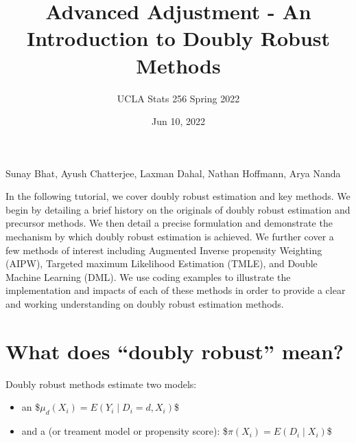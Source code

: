 \documentclass[letterpaper,10pt,english]{jupyterBook}
\title{Advanced Adjustment - An Introduction to Doubly Robust Methods}
\date{Jun 10, 2022}
\author{UCLA Stats 256 Spring 2022}
\begin{document}
\pagestyle{empty}
\sphinxmaketitle
\pagestyle{plain}
\sphinxtableofcontents
\pagestyle{normal}
\label{\detokenize{intro::doc}}


\begin{DUlineblock}{0em}
\item[] 
\end{DUlineblock}

\sphinxAtStartPar
{} Sunay Bhat, Ayush Chatterjee, Laxman Dahal, Nathan Hoffmann, Arya Nanda

\begin{DUlineblock}{0em}
\item[] 
\end{DUlineblock}

\sphinxAtStartPar
In the following tutorial, we cover doubly robust estimation and key methods. We begin by detailing a brief history on the originals of doubly robust estimation and precursor methods. We then detail a precise formulation and demonstrate the mechanism by which doubly robust estimation is achieved. We further cover a few methods of interest including Augmented Inverse propensity Weighting (AIPW), Targeted maximum Likelihood Estimation (TMLE), and Double Machine Learning (DML). We use coding examples to illustrate the implementation and impacts of each of these methods in order to provide a clear and working understanding on doubly robust estimation methods.

\sphinxstepscope


\chapter{What does “doubly robust” mean?}
\label{\detokenize{Introduction and Conceptual Overview:what-does-doubly-robust-mean}}\label{\detokenize{Introduction and Conceptual Overview::doc}}
\sphinxAtStartPar
Doubly robust methods estimate two models:
\begin{itemize}
\item {} 
\sphinxAtStartPar
an 
\$\(\mu_d(X_i) = E(Y_i \mid D_i = d, X_i)\)\$

\item {} 
\sphinxAtStartPar
and a  (or treament model or propensity score):
\$\(\pi(X_i) = E(D_i \mid X_i)\)\$

\end{itemize}
\end{document}
